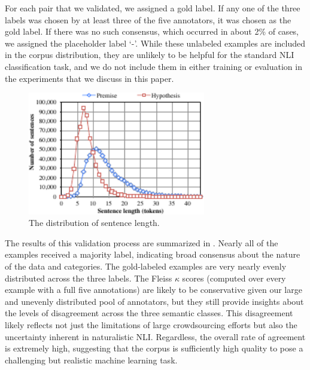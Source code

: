 For each pair that we validated, we assigned a gold label. If any one of
the three labels was chosen by at least three of the five annotators, it was 
chosen as the gold label. If there was no such consensus, which
occurred in about 2\% of cases, we assigned the placeholder label `-'. 
While these unlabeled examples are included in the corpus distribution, they are
unlikely to be helpful for the standard NLI classification task, and
we do not include them in either training or evaluation in the experiments that we 
discuss in this paper.

 
\begin{figure}
\center
\includegraphics[width=3.05in]{length_dist}
\caption{\label{length-dist}The distribution of sentence length.} 
\end{figure}
 

The results of this validation process
are summarized in . 
Nearly all of the examples received a majority
label, indicating broad consensus about the nature of the data and
categories. The gold-labeled examples are very nearly evenly
distributed across the three labels. The Fleiss $\kappa$ scores 
(computed over every example with a full five annotations)
are likely to be conservative given our large and
unevenly distributed pool of annotators, but they still provide insights
about the levels of disagreement across the three semantic
classes. This disagreement likely reflects not just the limitations of
large crowdsourcing efforts but also the uncertainty inherent in naturalistic NLI.
Regardless, the overall rate of agreement is extremely high,
suggesting that the corpus is sufficiently high quality to pose a
challenging but realistic machine learning task.

